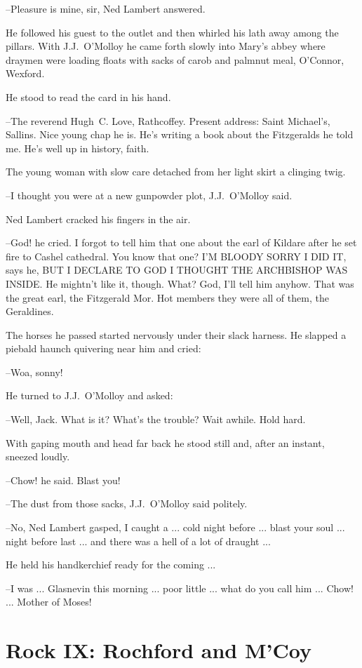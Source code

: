 --Pleasure is mine, sir,
Ned Lambert answered.

He followed his guest to the outlet
and then whirled his lath away
among the pillars.
With J.J.~O'Molloy he came forth slowly
into Mary's
abbey
where draymen were loading floats with sacks of carob and palmnut
meal,
O'Connor, Wexford.

He stood to read the card in his hand.

--The reverend Hugh~C. Love, Rathcoffey.
Present address:
Saint Michael's, Sallins.
Nice young chap he is.
He's writing a book about the Fitzgeralds
he told me.
He's well up in history, faith.

The young woman with slow care
detached from her light skirt a clinging twig.

--I thought you were at a new gunpowder plot,
J.J.~O'Molloy said.

Ned Lambert cracked his fingers in the air.

--God!
he cried.
I forgot to tell him that one about the earl of Kildare
after he set fire to Cashel cathedral.
You know that one? I'M BLOODY SORRY
I DID IT,
says he,
BUT I DECLARE TO GOD I THOUGHT THE ARCHBISHOP WAS
INSIDE.
He mightn't like it, though.
What?
God, I'll tell him anyhow.
That was the great earl, the Fitzgerald Mor.
Hot members they were all of
them, the Geraldines.

The horses he passed
started nervously
under their slack harness.
He slapped a piebald haunch quivering near him
and cried:

--Woa, sonny!

He turned to J.J.~O'Molloy and asked:

--Well, Jack.
What is it?
What's the trouble?
Wait awhile.
Hold hard.

With gaping mouth and head far back
he stood still and, after an
instant,
sneezed loudly.

--Chow!
he said.
Blast you!

--The dust from those sacks,
J.J.~O'Molloy said politely.

--No,
Ned Lambert gasped,
I caught a ...
cold night before ...
blast your soul ...
night before last ...
and there was a hell of a lot of draught ...

He held his handkerchief ready for the coming ...

--I was ...
Glasnevin this morning ...
poor little ...
what do you call him ...
Chow! ...
Mother of Moses!


\section*{Rock IX: Rochford and M'Coy}



